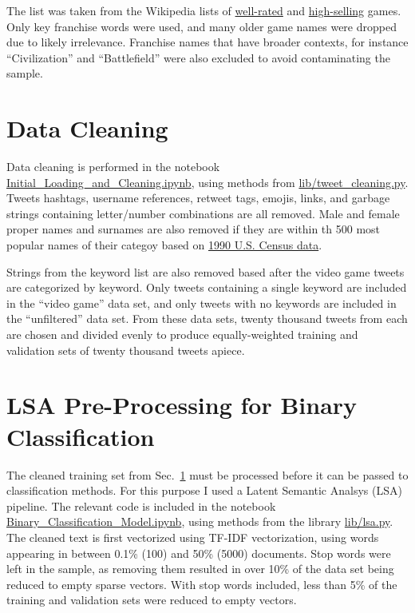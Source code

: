 \documentclass[11pt]{revtex4-1}
\newcommand{\secref}[1]{Sec.~\ref{sec:#1}}
\begin{document}
\noindent The list was taken from the Wikipedia lists of
\href{http://en.wikipedia.org/wiki/List_of_video_games_considered_the_best}{well-rated}
and
\href{http://en.wikipedia.org/wiki/List_of_best-selling_video_games}{high-selling}
games.  Only key franchise words were used, and many older game names
were dropped due to likely irrelevance.  Franchise names that have
broader contexts, for instance ``Civilization'' and ``Battlefield''
were also excluded to avoid contaminating the sample.





\section{Data Cleaning}
\label{sec:cleaning}

Data cleaning is performed in the notebook
\href{http://github.com/davidsanford/DSI_Capstone/blob/master/Initial_Loading_and_Cleaning.ipynb}{Initial\_Loading\_and\_Cleaning.ipynb},
using methods from
\href{http://github.com/davidsanford/DSI_Capstone/blob/master/lib/tweet_cleaning.py}{lib/tweet\_cleaning.py}.
Tweets hashtags, username references, retweet tags, emojis, links, and
garbage strings containing letter/number combinations are all removed.
Male and female proper names and surnames are also removed if they are
within th 500 most popular names of their categoy based on
\href{http://catalog.data.gov/dataset/names-from-census-1990}{1990
  U.S. Census data}.

Strings from the keyword list are also removed based after the video
game tweets are categorized by keyword.  Only tweets containing a
single keyword are included in the ``video game'' data set, and only
tweets with no keywords are included in the ``unfiltered'' data set.
From these data sets, twenty thousand tweets from each are chosen and
divided evenly to produce equally-weighted training and validation
sets of twenty thousand tweets apiece.





\section{LSA Pre-Processing for Binary Classification}
\label{sec:lsa}

The cleaned training set from \secref{cleaning} must be processed
before it can be passed to classification methods.  For this purpose I
used a Latent Semantic Analsys (LSA) pipeline.  The relevant code is
included in the notebook
\href{http://github.com/davidsanford/DSI_Capstone/Binary_Classification_Model.ipynb}{Binary\_Classification\_Model.ipynb},
using methods from the library
\href{http://github.com/davidsanford/DSI_Capstone/lib/lsa.py}{lib/lsa.py}.
The cleaned text is first vectorized using TF-IDF vectorization, using
words appearing in between 0.1\% (100) and 50\% (5000) documents.
Stop words were left in the sample, as removing them resulted in over
10\% of the data set being reduced to empty sparse vectors.  With stop
words included, less than 5\% of the training and validation sets
were reduced to empty vectors.
\end{document}
